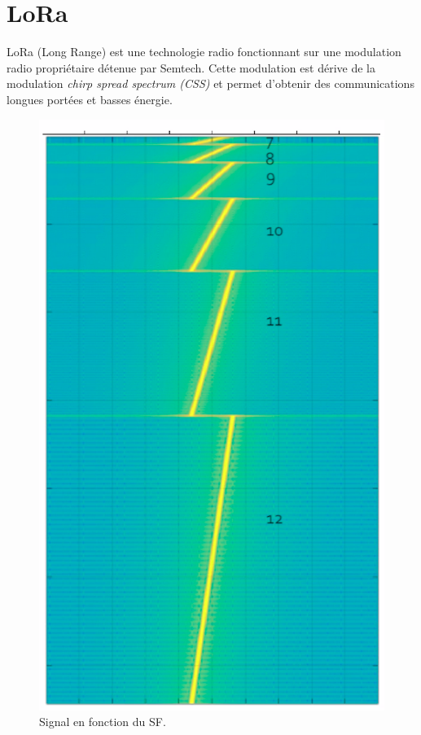 \section{LoRa}\label{sec:etat_art-lora}
\renewcommand{\rightmark}{LoRa}

LoRa (Long Range) est une technologie radio  fonctionnant sur une modulation radio propriétaire
détenue par Semtech. Cette modulation est dérive de la modulation \textit{chirp spread spectrum (CSS)} et permet d'obtenir des communications longues portées et basses énergie.

\begin{figure}
    \includegraphics[scale=0.25]{res/pictures/lora-sf.png}
    \caption{Signal en fonction du SF.}
    \label{fig:state-sf}
\end{figure}
